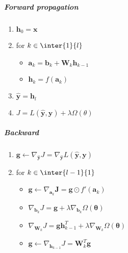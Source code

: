 \subparagraph{Forward propagation}
\begin{enumerate}
    \item $\bm{h}_{0} = \bm{x} $
    \item for $k \in \inter{1}{l}$
        \begin{itemize}
            \item $\bm{a}_{k} = \bm{b}_{k} + \bm{W}_{k}\bm{h}_{k-1}$
            \item $\bm{h}_{k} = f(\bm{a}_{k})$
        \end{itemize}
    \item $\hat{\bm{y}} = \bm{h}_{l}$
    \item $J = L(\hat{\bm{y}}, \bm{y}) + \lambda\Omega(\theta)$
        
\end{enumerate}

\subparagraph{Backward}
\begin{enumerate}
    \item $\bm{g} \leftarrow \nabla_{\hat{\bm{y}}}J = \nabla_{\hat{\bm{y}}}L(
        \hat{\bm{y}}, \bm{y})$ 
    \item for $k\in\inter{l-1}{1}$
        \begin{itemize}
            \item $\bm{g} \leftarrow \nabla_{\bm{a}_{k}}\bm{J} = \bm{g}\odot 
                f'(\bm{a}_{k})$
            \item $\nabla_{\bm{b}_{k}}J = \bm{g} + 
                \lambda\nabla_{\bm{b}_{k}}\Omega(\bm{\theta})$
            \item $\nabla_{\bm{W}_{k}}J = \bm{g}\bm{h}^{T}_{k-1}
                + \lambda\nabla_{\bm{W}_{k}}\Omega(\bm{\theta})$
            \item $\bm{g} \leftarrow \nabla_{\bm{h}_{k-1}}J = \bm{W}_{k}^{T}\bm{g}$
        \end{itemize}
        
\end{enumerate}


